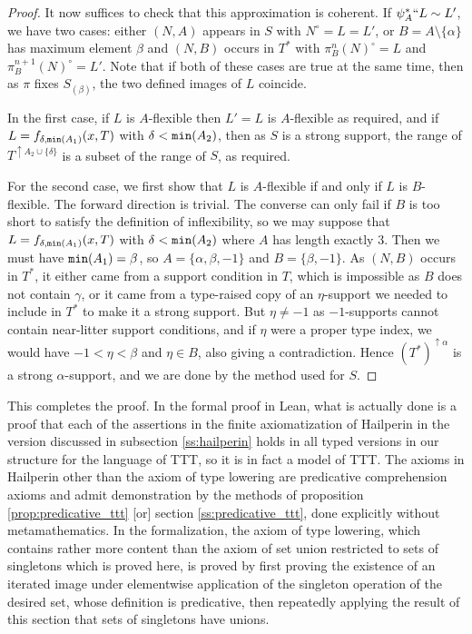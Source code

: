 \documentclass[112pt]{article}
\theoremstyle{definition}
\theoremstyle{remark}
\begin{document}
\begin{proof}
{
It now suffices to check that this approximation is coherent.
If $\psi_A^*``L \sim L'$, we have two cases: either $(N,A)$ appears in $S$ with $N^\circ = L = L'$, or $B = A\setminus\{\alpha\}$ has maximum element $\beta$ and $(N,B)$ occurs in $T^*$ with $\pi_B^n(N)^\circ = L$ and $\pi_B^{n+1}(N)^\circ = L'$.
Note that if both of these cases are true at the same time, then as $\pi$ fixes $S_{(\beta)}$, the two defined images of $L$ coincide.

In the first case, if $L$ is $A$-flexible then $L' = L$ is $A$-flexible as required, and if $L = f_{\delta,{\tt min}(A_1)}(x,T)$ with $\delta < {\tt min}(A_2)$, then as $S$ is a strong support, the range of $T^{\uparrow A_2 \cup \{\delta\}}$ is a subset of the range of $S$, as required.

For the second case, we first show that $L$ is $A$-flexible if and only if $L$ is $B$-flexible.
The forward direction is trivial.
The converse can only fail if $B$ is too short to satisfy the definition of inflexibility, so we may suppose that $L = f_{\delta,{\tt min}(A_1)}(x,T)$ with $\delta < {\tt min}(A_2)$ where $A$ has length exactly 3.
Then we must have ${\tt min}(A_1) = \beta$, so $A = \{\alpha,\beta,-1\}$ and $B = \{\beta,-1\}$.
As $(N,B)$ occurs in $T^*$, it either came from a support condition in $T$, which is impossible as $B$ does not contain $\gamma$, or it came from a type-raised copy of an $\eta$-support we needed to include in $T^*$ to make it a strong support.
But $\eta \neq -1$ as $-1$-supports cannot contain near-litter support conditions, and if $\eta$ were a proper type index, we would have $-1 < \eta < \beta$ and $\eta \in B$, also giving a contradiction.
Hence $(T^*)^{\uparrow\alpha}$ is a strong $\alpha$-support, and we are done by the method used for $S$.
}


\end{proof}

This completes the proof.  In the formal proof in Lean, what is actually done is a proof that each of the assertions in the finite axiomatization of Hailperin in the version discussed in {subsection \ref{ss:hailperin}}  holds in all typed versions in our structure for the language of TTT, so it is in fact a model of TTT.  The axioms in Hailperin other than the axiom of type lowering are predicative comprehension axioms and
admit demonstration by the methods of {proposition \ref{prop:predicative_ttt} [or] section \ref{ss:predicative_ttt}}, done explicitly without metamathematics.  In the formalization, the axiom of type lowering, which contains rather more content than the axiom of set union restricted to sets of singletons which is proved here, is proved by first proving the existence of an iterated image under elementwise application of the singleton operation of the desired set, whose definition is predicative, then repeatedly applying the result of this section that sets of singletons have unions.
\end{document}
